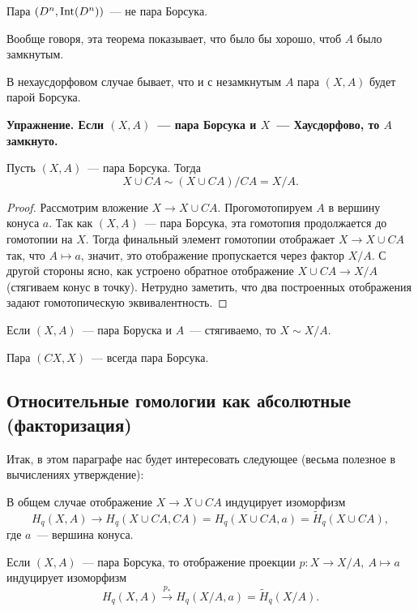     \begin{corollary}
        Пара $(D^n, \operatorname{Int}(D^n))$~--- не пара Борсука. 
    \end{corollary}

    Вообще говоря, эта теорема показывает, что было бы хорошо, чтоб  $A$ было замкнутым.

    \begin{remark}
       В нехаусдорфовом случае бывает, что и с незамкнутым $A$ пара $(X, A)$ будет парой Борсука.
    \end{remark}

    \noindent\bf{Упражнение.} Если $(X, A)$~--- пара Борсука и $X$~--- Хаусдорфово, то $A$ замкнуто. 

    \begin{statement}\label{BorsukPairProp}
        Пусть $(X, A)$~--- пара Борсука. Тогда
        \[ X \cup CA \sim (X \cup CA)/CA = X / A.  \]
    \end{statement}
    \begin{proof}
        Рассмотрим вложение $X \to X \cup CA$. Прогомотопируем $A$ в вершину конуса $a$. Так как $(X, A)$~--- пара Борсука,
        эта гомотопия продолжается до гомотопии на $X$. Тогда финальный элемент гомотопии отображает $X \to X \cup CA$ так, что $A \mapsto a$,
        значит, это отображение пропускается через фактор $X/A$. С другой стороны ясно, как устроено обратное отображение $X \cup CA \to X/A$ (стягиваем конус в точку). Нетрудно заметить, что два построенных отображения задают гомотопическую эквивалентность.
    \end{proof}

    \begin{corollary}
         Если $(X, A)$~--- пара Боруска и $A$~--- стягиваемо, то $X \sim X/A$.
    \end{corollary}

    \begin{statement}
        Пара $(CX, X)$~--- всегда пара Борсука.
    \end{statement}

    \subsection{Относительные гомологии как абсолютные (факторизация)}

    Итак, в этом параграфе нас будет интересовать следующее (весьма полезное в вычислениях утверждение):

    \begin{theorem}
        В общем случае отображение $X \to X \cup CA$ индуцирует изоморфизм
        \[ H_{q}(X, A) \to H_{q}(X \cup CA, CA) = H_{q}(X \cup CA, a) = \widetilde{H}_{q}(X \cup CA), \]
        где $a$~--- вершина конуса.

        Если $(X, A)$~--- пара Борсука, то отображение проекции $p\colon X \to X/A, \ A \mapsto a$ индуцирует изоморфизм
        \[ H_{q}(X, A) \xrightarrow{p_{*}} H_{q}(X/A, a) = \widetilde{H}_{q}(X/A). \]
    \end{theorem}

